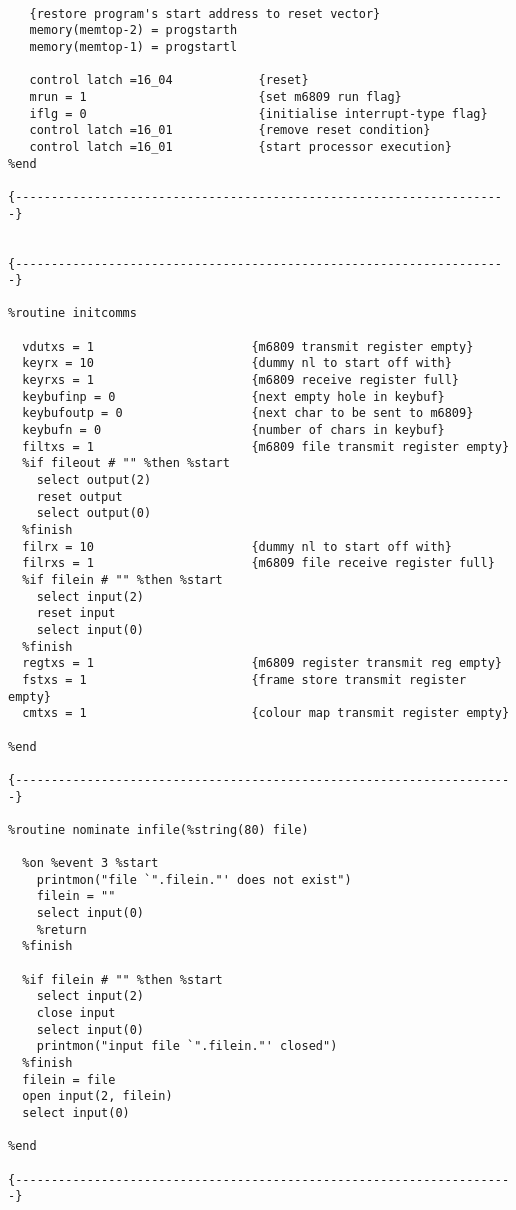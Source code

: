 \begin{verbatim}
  
   {restore program's start address to reset vector}
   memory(memtop-2) = progstarth
   memory(memtop-1) = progstartl

   control latch =16_04            {reset}
   mrun = 1                        {set m6809 run flag}
   iflg = 0                        {initialise interrupt-type flag}
   control latch =16_01            {remove reset condition}
   control latch =16_01            {start processor execution}
%end

{---------------------------------------------------------------------}


{---------------------------------------------------------------------}

%routine initcomms

  vdutxs = 1                      {m6809 transmit register empty}
  keyrx = 10                      {dummy nl to start off with}
  keyrxs = 1                      {m6809 receive register full}
  keybufinp = 0                   {next empty hole in keybuf}
  keybufoutp = 0                  {next char to be sent to m6809}
  keybufn = 0                     {number of chars in keybuf}
  filtxs = 1                      {m6809 file transmit register empty}
  %if fileout # "" %then %start
    select output(2)
    reset output
    select output(0)
  %finish
  filrx = 10                      {dummy nl to start off with}
  filrxs = 1                      {m6809 file receive register full}
  %if filein # "" %then %start
    select input(2)
    reset input
    select input(0)
  %finish
  regtxs = 1                      {m6809 register transmit reg empty}
  fstxs = 1                       {frame store transmit register empty}
  cmtxs = 1                       {colour map transmit register empty}

%end

{----------------------------------------------------------------------}

%routine nominate infile(%string(80) file)

  %on %event 3 %start
    printmon("file `".filein."' does not exist")
    filein = ""
    select input(0)
    %return
  %finish

  %if filein # "" %then %start
    select input(2)
    close input
    select input(0)
    printmon("input file `".filein."' closed")
  %finish
  filein = file
  open input(2, filein)
  select input(0)

%end

{----------------------------------------------------------------------}


\end{verbatim}
